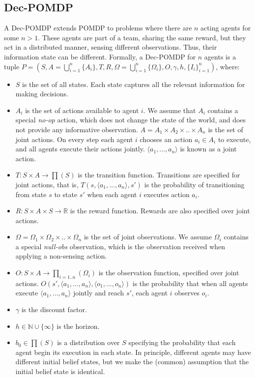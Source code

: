 \documentclass[letterpaper]{article} %
\begin{document}
\subsection{Dec-POMDP}

A Dec-POMDP extends POMDP to problems where there are $n$ acting agents for some $n>1$. 
These agents are part of a team, sharing the same reward, but they act in a distributed manner,
sensing different observations. Thus, their information state can be different. 
Formally, a Dec-POMDP for $n$ agents is a tuple  $P=(S, A=\bigcup_{i=1}^{n}{\{A_i\}}, T, R, \Omega=\bigcup_{i=1}^{n}{\{\Omega_i\}},  O, \gamma, h, {\{I_i\}}_{i=1}^{n})$, where:
\begin{itemize}
\item
$S$ is the set of all states. Each state captures all the relevant information for making decisions. 
\item
$A_i$ is the set of actions available to agent $i$. We assume that $A_i$ contains a special {\em no-op} action, which does not change the state of the world, and does not provide any informative observation.
$A=A_1 \times A_2 \times .. \times A_n$ is the set of joint actions. On every step each agent $i$ chooses an action $a_i \in A_i$ to execute, and all agents execute their actions jointly. $\langle a_1,...,a_n \rangle$ is known as a joint action.
\item
$T:S \times A \rightarrow \prod(S)$  is the transition function. Transitions are specified for joint actions, that is, $T(s, \langle a_1,...,a_n \rangle, s')$ is the probability of transitioning from state $s$ to state $s'$ when each agent $i$ executes action $a_i$.
\item
$R:S \times A \times S \rightarrow \mathbb{R}$  is the reward function. Rewards are also specified over joint actions.
\item
$\Omega = \Omega_1 \times \Omega_2 \times .. \times \Omega_n$ is the set of joint observations. We assume $\Omega_i$ contains a special {\em null-obs} observation, which is the observation received when applying a non-sensing action.
\item
$O:S \times A \rightarrow \prod_{i=1..n}(\Omega_i)$  is the observation function, specified over joint actions. $O(s',\langle a_1,...,a_n \rangle,\langle o_1,...,o_n \rangle)$ is the probability that when all agents execute $\langle a_1,...,a_n \rangle$ jointly and reach $s'$, each agent $i$ observes $o_i$.
\item
$\gamma$  is the discount factor.
\item
$h\in\mathbb{N}\cup\{\infty\}$ is the horizon.
\item
$b_0 \in \prod(S)$ is a distribution over $S$ specifying the probability that each agent begin its execution in each state. In principle, different agents may have different initial belief states, but
we make the (common) assumption that the initial belief state is identical. 
\end{itemize}
\end{document}
